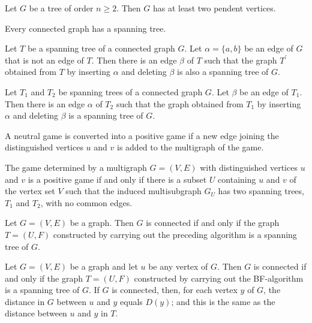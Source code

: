 \begin{theorem}
  \label{thm:11.5.6}
  Let $G$ be a tree of order $n \geq 2$. Then $G$ has at least two pendent vertices.
\end{theorem}

\begin{theorem}
  \label{thm:11.5.7}
  Every connected graph has a spanning tree.
\end{theorem}

\begin{theorem}
  \label{thm:11.5.8}
  Let $T$ be a spanning tree of a connected graph $G$. Let $\alpha = \{a,b\}$ be an edge of $G$ that
  is not an edge of $T$. Then there is an edge $\beta$ of $T$ such that the graph $T^{\prime}$ 
  obtained from $T$ by inserting $\alpha$ and deleting $\beta$ is also a spanning tree of $G$.
\end{theorem}

\begin{theorem}
  \label{thm:11.5.9}
  Let $T_1$ and $T_2$ be spanning trees of a connected graph $G$. Let $\beta$ be an edge of $T_1$. Then there is an edge $\alpha$ of $T_2$ such that the graph obtained from $T_1$ by inserting $\alpha$ and deleting $\beta$ is a spanning tree of $G$.
\end{theorem}

\begin{theorem}
  \label{thm:11.6.1}
  A neutral game is converted into a positive game if a new edge joining the distinguished vertices 
  $u$ and $v$ is added to the multigraph of the game.
\end{theorem}

\begin{theorem}
  \label{thm:11.6.2}
  The game determined by a multigraph $G = (V, E)$ with distinguished vertices $u$ and $v$ is a 
  positive game if and only if there is a subset $U$ containing $u$ and $v$ of the vertex set $V$ 
  such that the induced multisubgraph $G_U$ has two spanning trees, $T_1$ and $T_2$, with no common 
  edges.
\end{theorem}

\begin{theorem}
  \label{thm:11.7.1}
  Let $G = (V, E)$ be a graph. Then $G$ is connected if and only if the graph $T = (U, F)$ 
  constructed by carrying out the preceding algorithm is a spanning tree of $G$.
\end{theorem}

\begin{theorem}
  \label{thm:11.7.2}
  Let $G = (V, E)$ be a graph and let $u$ be any vertex of $G$. Then $G$ is connected if and only if
  the graph $T = (U, F)$ constructed by carrying out the BF-algorithm is a spanning tree of $G$. If 
  $G$ is connected, then, for each vertex $y$ of $G$, the distance in $G$ between $u$ and $y$ equals
  $D(y)$; and this is the same as the distance between $u$ and $y$ in $T$.
\end{theorem}

